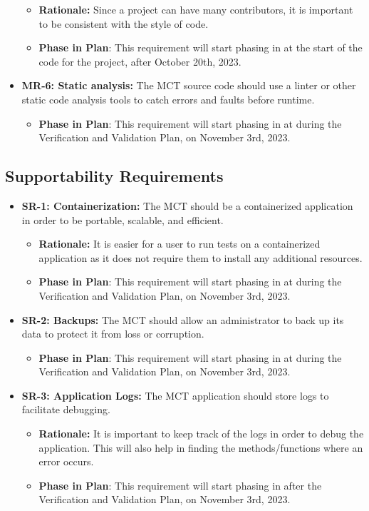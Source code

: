 \documentclass[12pt]{article}
\begin{document}
\begin{itemize}
    \begin{itemize}
        \item \textbf{Rationale: }Since a project can have many contributors, it is important to be consistent with the style of code.
        \item \textbf{Phase in Plan}: This requirement will start phasing in at the start of the code for the project, after October 20th, 2023.
    \end{itemize}
    \item \textbf{MR-6: Static analysis:} The MCT source code should use a linter or other static code analysis tools to catch errors and faults before runtime.
    \begin{itemize}
        \item \textbf{Phase in Plan}: This requirement will start phasing in at during the Verification and Validation Plan, on November 3rd, 2023.
    \end{itemize}
\end{itemize}


\subsection{Supportability Requirements}

\begin{itemize}
    \item \textbf{SR-1: Containerization: }The MCT should be a containerized application in order to be portable, scalable, and efficient.
    \begin{itemize}
        \item \textbf{Rationale: }It is easier for a user to run tests on a containerized application as it does not require them to install any additional resources.
        \item \textbf{Phase in Plan}: This requirement will start phasing in at during the Verification and Validation Plan, on November 3rd, 2023.
    \end{itemize}
    \item \textbf{SR-2: Backups: }The MCT should allow an administrator to back up its data to protect it from loss or corruption.
    \begin{itemize}
        \item \textbf{Phase in Plan}: This requirement will start phasing in at during the Verification and Validation Plan, on November 3rd, 2023.
    \end{itemize}
    \item \textbf{SR-3: Application Logs:} The MCT application should store logs to facilitate debugging.
    \begin{itemize}
        \item \textbf{Rationale: }It is important to keep track of the logs in order to debug the application. This will also help in finding the methods/functions where an error occurs.
        \item \textbf{Phase in Plan}: This requirement will start phasing in after the Verification and Validation Plan, on November 3rd, 2023.
    \end{itemize}
\end{itemize}
\end{document}
